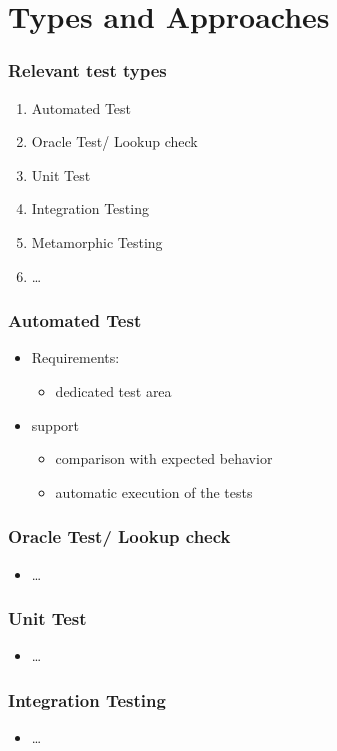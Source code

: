 \section{Types and Approaches}

\begin{frame}[fragile]
\frametitle{Relevant test types}
\begin{enumerate}
\item Automated Test
\item Oracle Test/ Lookup check
\item Unit Test
\item Integration Testing
\item Metamorphic Testing
\item \ldots
\end{enumerate}
\end{frame}

\begin{frame}[fragile]
\frametitle{Automated Test}
\begin{itemize}
\item Requirements:
\begin{itemize}
\item dedicated test area
\end{itemize}
\item support
\begin{itemize}
\item comparison with expected behavior
\item automatic execution of the tests
\end{itemize}
\end{itemize}
\end{frame}

\begin{frame}[fragile]
\frametitle{Oracle Test/ Lookup check}
\begin{itemize}
\item \ldots
\end{itemize}
\end{frame}

\begin{frame}[fragile]
\frametitle{Unit Test}
\begin{itemize}
\item \ldots
\end{itemize}
\end{frame}

\begin{frame}[fragile]
\frametitle{Integration Testing}
\begin{itemize}
\item \ldots
\end{itemize}
\end{frame}

